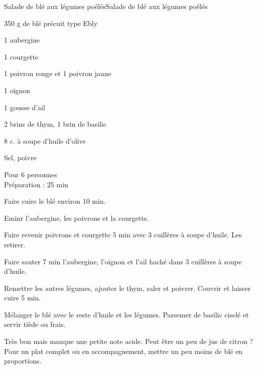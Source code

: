 \begin{recette}{Salade de blé aux légumes poêlés}{Salade de blé aux légumes poêlés}

\begin{ingredients}
350 g de blé précuit type Ebly\par
1 aubergine\par
1 courgette\par
1 poivron rouge et 1 poivron jaune\par
1 oignon\par
1 gousse d'ail\par
2 brins de thym, 1 brin de basilic\par
8 c. à soupe d'huile d'olive\par
Sel, poivre\par
\end{ingredients}

\begin{infos}
Pour 6 personnes\\
Préparation : 25 min\\
\end{infos}

\begin{etapes}
\item Faire cuire le blé environ 10 min.
\item Eminr l'aubergine, les poivrons et la courgette.
\item Faire revenir poivrons et courgette 5 min avec 3 cuillères à soupe d'huile. Les retirer.
\item Faire sauter 7 min l'aubergine, l'oignon et l'ail haché dans 3 cuillères à soupe d'huile.
\item Remettre les autres légumes, ajouter le thym, saler et poivrer. Couvrir et laisser cuire 5 min.
\item Mélanger le blé avec le reste d'huile et les légumes. Parsemer de basilic ciselé et servir tiède ou frais.
\end{etapes}

\begin{conseils}
Très bon mais manque une petite note acide. Peut être un peu de jus de citron ?
Pour un plat complet ou en accompagnement, mettre un peu moins de blé en proportions.
\end{conseils}

\end{recette}